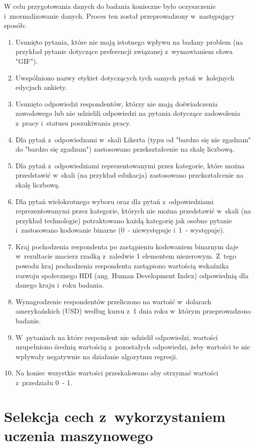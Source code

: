 W celu przygotowania danych do badania konieczne było oczyszczenie i~znormalizowanie danych. Proces ten został przeprowadzony w~następujący sposób:
\begin{enumerate}
    \item Usunięto pytania, które nie mają istotnego wpływu na badany problem (na przykład pytanie dotyczące preferencji związanej z~wymawianiem słowa "GIF").
    \item Uwspólniono nazwy etykiet dotyczących tych samych pytań w~kolejnych edycjach ankiety.
    \item Usunięto odpowiedzi respondentów, którzy nie mają doświadczenia zawodowego lub nie udzielili odpowiedzi na pytania dotyczące zadowolenia z~pracy i~statusu poszukiwania pracy.
    \item Dla pytań z~odpowiedzami w~skali Likerta (typu od "bardzo się nie zgadzam" do "bardzo się zgadzam") zastosowano przekształcenie na skalę liczbową.
    \item Dla pytań z~odpowiedziami reprezentowanymi przez kategorie, które można przedstawić w~skali (na przykład edukacja) zastosowano przekształcenie na skalę liczbową.
    \item Dla pytań wielokrotnego wyboru oraz dla pytań z~odpowiedziami reprezentowanymi przez kategorie, których nie można przedstawić w~skali (na przykład technologie) potraktowano każdą kategorię jak osobne pytanie i~zastosowano kodowanie binarne (0~- niewystępuje i~1~- występuje).
    \item Kraj pochodzenia respondenta po zastąpieniu kodowaniem binarnym daje w~rezultacie macierz rzadką z~zaledwie 1 elementem niezerowym. Z~tego powodu kraj pochodzenia respondenta zastąpiono wartością wskaźnika rozwoju społecznego HDI (ang. Human Development Index) \cite{hdi} odpowiednią dla danego kraju i~roku badania.
    \item Wynagrodzenie respondentów przeliczono na wartość w~dolarach amerykańskich (USD) według kursu z~1 dnia roku w~którym przeprowadzono badanie.
    \item W~pytaniach na które respondent nie udzielił odpowiedzi, wartości uzupełniono średnią wartością z~pozostałych odpowiedzi, żeby wartości te nie wpływały negatywnie na działanie algorytmu regresji.
    \item Na koniec wszystkie wartości przeskalowano aby otrzymać wartości z~przedziału 0~- 1.
    \end{enumerate}

\section{Selekcja cech z~wykorzystaniem uczenia maszynowego}\label{sec:analysis:feature-selection-xgb}

